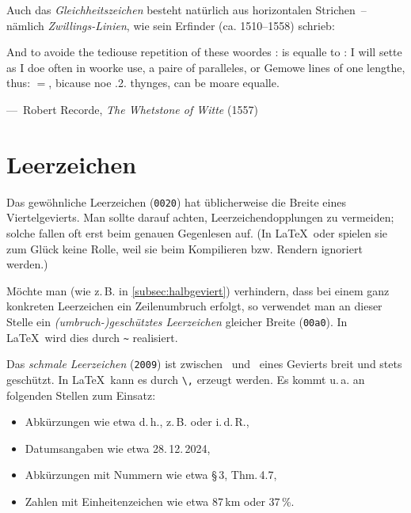 Auch das \emph{Gleichheitszeichen} \Char{$=$} besteht natürlich aus horizontalen
Strichen~-- nämlich \emph{Zwillings-Linien}, wie sein Erfinder
 (ca. 1510--1558) schrieb:
\begin{displayquote}
  \foreignlanguage{british}{And to avoide the tediouse repetition of
    these woordes : is equalle to : I will sette as I doe often in
    woorke use, a paire of paralleles, or Gemowe lines of one lengthe,
    thus: $=$, bicause noe .2. thynges, can be moare equalle.}

  \quad---~Robert Recorde, \emph{The Whetstone of Witte} (1557)
\end{displayquote}




\section{Leerzeichen}

Das gewöhnliche Leerzeichen (\texttt{0020}) hat üblicherweise die Breite eines
Viertelgevierts. Man sollte darauf achten, Leerzeichendopplungen zu vermeiden;
solche fallen oft erst beim genauen Gegenlesen auf. (In \LaTeX\ oder 
spielen sie zum Glück keine Rolle, weil sie beim Kompilieren bzw. Rendern
ignoriert werden.)

Möchte man (wie z.\,B. in \cref{subsec:halbgeviert}) verhindern, dass bei einem
ganz konkreten Leerzeichen ein Zeilenumbruch erfolgt, so verwendet man an dieser
Stelle ein \emph{(umbruch-)geschütztes Leerzeichen} gleicher Breite
(\texttt{00a0}). In \LaTeX\ wird dies durch \verb!~! realisiert.

Das \emph{schmale Leerzeichen} (\texttt{2009}) ist zwischen \ und
\ eines Gevierts breit und stets geschützt. In \LaTeX\ kann
es durch \verb!\,! erzeugt werden. Es kommt u.\,a. an folgenden Stellen zum Einsatz:
\begin{itemize}[nosep]
\item Abkürzungen wie etwa d.\,h., z.\,B. oder i.\,d.\,R.,
\item Datumsangaben wie etwa 28.\,12.\,2024,
\item Abkürzungen mit Nummern wie etwa §\,3, Thm.\,4.7,
\item Zahlen mit Einheitenzeichen wie etwa 87\,km oder 37\,\%.
\end{itemize}

